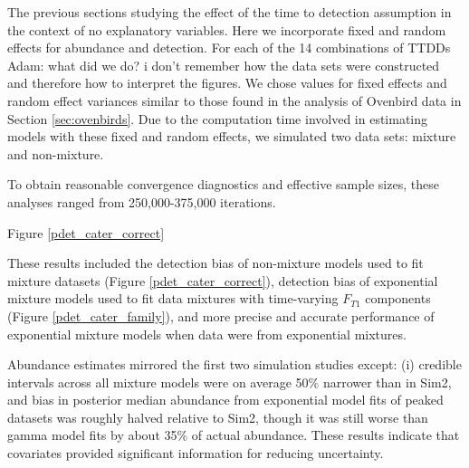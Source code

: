 \documentclass[useAMS,usenatbib,referee,12pt]{article}
\newcommand{\jarad}[1]{{\color{Orange} #1}}
\begin{document}
The previous sections studying the effect of the time to detection assumption in the context of no explanatory variables.
Here we incorporate fixed and random effects for abundance and detection. 
For each of the 14 combinations of TTDDs \jarad{Adam: what did we do? i don't remember how the data sets were constructed and therefore how to interpret the figures.}
We chose values for fixed effects and random effect variances similar to those found in the analysis of Ovenbird data in Section \ref{sec:ovenbirds}.
Due to the computation time involved in estimating models with these fixed and random effects, we simulated two data sets: mixture and non-mixture. 


To obtain reasonable convergence diagnostics and effective sample sizes, these analyses ranged from 250,000-375,000 iterations.

Figure \ref{pdet_cater_correct}

 

These results included the detection bias of non-mixture models used to fit mixture datasets (Figure \ref{pdet_cater_correct}), detection bias of exponential mixture models used to fit data mixtures with time-varying $F_{T1}$ components (Figure \ref{pdet_cater_family}), and more precise and accurate performance of exponential mixture models when data were from exponential mixtures.  

Abundance estimates mirrored the first two simulation studies except: (i) credible intervals across all mixture models were on average 50\% narrower than in Sim2, and bias in posterior median abundance from exponential model fits of peaked datasets was roughly halved relative to Sim2, though it was still worse than gamma model fits by about 35\% of actual abundance.
These results indicate that covariates provided significant information for reducing uncertainty.
\end{document}
